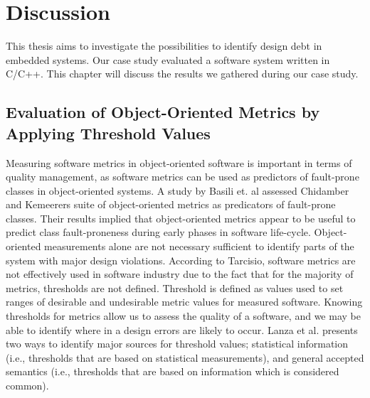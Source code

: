 
\chapter{Discussion}
This thesis aims to investigate the possibilities to identify design debt in embedded systems. Our case study evaluated a software system written in C/C++. This chapter will discuss the results we gathered during our case study. %



\section{Evaluation of Object-Oriented Metrics by Applying Threshold Values}
Measuring software metrics in object-oriented software is important in terms of quality management\cite{tarcisio,ferreira2012identifying}, as software metrics can be used as predictors of fault-prone classes in object-oriented systems\cite{basili1996validation}. A study by Basili et. al\cite{basili1996validation} assessed Chidamber and Kemeerers\cite{chidamber1994metrics} suite of object-oriented metrics as predicators of fault-prone classes. Their results implied that object-oriented metrics appear to be useful to predict class fault-proneness during early phases in software life-cycle. Object-oriented measurements alone are not necessary sufficient to identify parts of the system with major design violations. According to Tarcisio, software metrics are not effectively used in software industry due to the fact that for the majority of metrics, thresholds are not defined\cite{tarcisio}. Threshold is defined as values used to set ranges of desirable and undesirable metric values for measured software\cite{ferreira2012identifying}. Knowing thresholds for metrics allow us to assess the quality of a software, and we may be able to identify where in a design errors are likely to occur. Lanza et al.\cite{lanza2007object} presents two ways to identify major sources for threshold values; statistical information (i.e., thresholds that are based on statistical measurements), and general accepted semantics (i.e., thresholds that are based on information which is considered common).  

